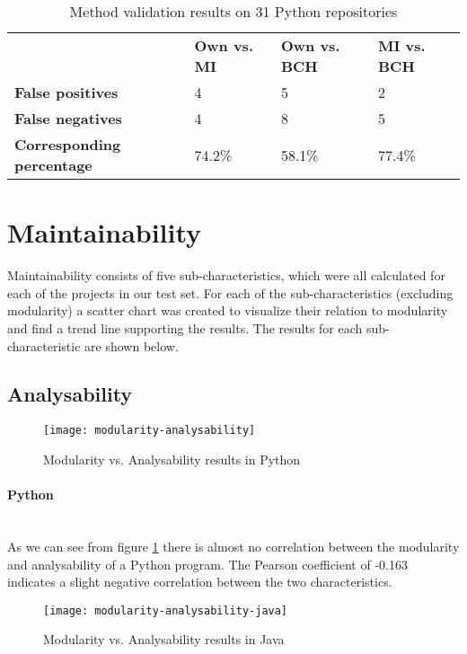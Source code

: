 \documentclass[twoside]{uva-inf-bachelor-thesis}
\newcommand{\myparagraph}[1]{\paragraph{#1}\mbox{}\\}
\begin{document}
\begin{table}[H]
\centering
\caption{Method validation results on 31 Python repositories}
\label{table:validation}
\begin{tabular}{llll}
\textbf{}                         & \textbf{Own vs. MI} & \textbf{Own vs. BCH} & \textbf{MI vs. BCH} \\ 
\textbf{False positives}          & 4                   & 5                    & 2                   \\
\textbf{False negatives}          & 4                   & 8                    & 5                   \\
\textbf{Corresponding percentage} & 74.2\%              & 58.1\%               & 77.4\%             
\end{tabular}
\end{table}

\section{Maintainability}
Maintainability consists of five sub-characteristics, which were all calculated for each of the projects in our test set. For each of the sub-characteristics (excluding modularity) a scatter chart was created to visualize their relation to modularity and find a trend line supporting the results. The results for each sub-characteristic are shown below.

\subsection{Analysability}

\begin{figure}[H]
    \caption{Modularity vs. Analysability results in Python}
    \label{figure:mod-analysis}
    \centering
        \texttt{[image: modularity-analysability]}
\end{figure}

\myparagraph{Python}
As we can see from figure \ref{figure:mod-analysis} there is almost no correlation between the modularity and analysability of a Python program. The Pearson coefficient of -0.163 indicates a slight negative correlation between the two characteristics.

\begin{figure}[H]
    \caption{Modularity vs. Analysability results in Java}
    \label{figure:mod-analysis-java}
    \centering
        \texttt{[image: modularity-analysability-java]}
\end{figure}
\end{document}
